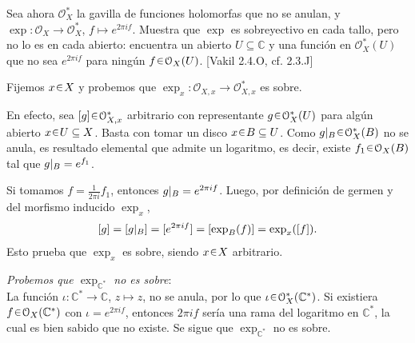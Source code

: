 \begin{ejer}\label{ejer:t3-exponencial-tallos}
Sea ahora $\mathcal O_X^*$ la gavilla de funciones holomorfas que no se anulan, y $\exp\colon\mathcal O_X\to\mathcal O_X^*$, $f\mapsto e^{2\pi i f}$. Muestra que $\exp$ es sobreyectivo en cada tallo, pero no lo es en cada abierto: encuentra un abierto $U\subseteq\mathbb C$ y una función en $\mathcal O_X^*(U)$ que no sea $e^{2\pi i f}$ para ningún $f\en\mathcal O_X(U)$. \hfill [Vakil 2.4.O, cf. 2.3.J]
\end{ejer}
\begin{sol}
Fijemos $x\en X$ y probemos que $\exp_x\colon\mathcal O_{X,x}\to\mathcal O_{X,x}^*$ es sobre.

En efecto, sea $[g]\en\mathcal O_{X,x}^*$ arbitrario con representante $g\en\mathcal O_X^*(U)$ para algún abierto $x\en U\subseteq X$. Basta con tomar un disco $x\en B\subseteq U$. Como $\restr{g}{B}\en\mathcal O_X^*(B)$ no se anula, es resultado elemental que admite un logaritmo, es decir, existe $f_1\en\mathcal O_X(B)$ tal que $\restr{g}{B}=e^{f_1}$.

Si tomamos $f=\frac{1}{2\pi i}f_1$, entonces $\restr{g}{B}=e^{2\pi i f}$. Luego, por definición de germen y del morfismo inducido $\exp_x$,
\[
[g]=[\restr{g}{B}]=[e^{2\pi i f}]=[\exp_B(f)]=\exp_x([f]).
\]
Esto prueba que $\exp_x$ es sobre, siendo $x\en X$ arbitrario.

\medskip
\noindent\emph{Probemos que $\exp_{\mathbb C^*}$ no es sobre}:\\
La función $\iota\colon\mathbb C^*\to\mathbb C$, $z\mapsto z$, no se anula, por lo que $\iota\en\mathcal O_X^*(\mathbb C^*)$. Si existiera $f\en\mathcal O_X(\mathbb C^*)$ con $\iota=e^{2\pi i f}$, entonces $2\pi i f$ sería una rama del logaritmo en $\mathbb C^*$, la cual es bien sabido que no existe. Se sigue que $\exp_{\mathbb C^*}$ no es sobre.
\end{sol}
